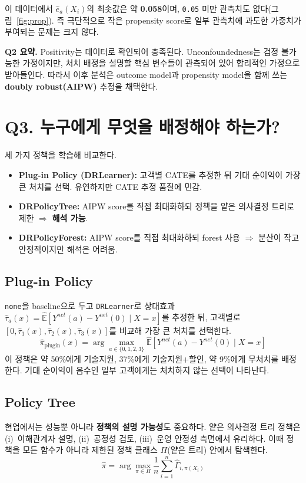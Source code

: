 \documentclass[11pt]{article}
\begin{document}
이 데이터에서 $\hat e_a(X_i)$의 최솟값은 약 \textbf{0.058}이며, \texttt{0.05} 미만 관측치도 없다(그림~\ref{fig:prop}). 즉 극단적으로 작은 propensity score로 일부 관측치에 과도한 가중치가 부여되는 문제는 크지 않다.

\textbf{Q2 요약.} Positivity는 데이터로 확인되어 충족된다. Unconfoundedness는 검정 불가능한 가정이지만, 처치 배정을 설명할 핵심 변수들이 관측되어 있어 합리적인 가정으로 받아들인다. 따라서 이후 분석은 outcome model과 propensity model을 함께 쓰는 \textbf{doubly robust(AIPW)} 추정을 채택한다.

\section{Q3. 누구에게 무엇을 배정해야 하는가?}

세 가지 정책을 학습해 비교한다.

\begin{itemize}[leftmargin=1.4em, itemsep=2pt]
  \item \textbf{Plug-in Policy (DRLearner):} 고객별 CATE를 추정한 뒤 기대 순이익이 가장 큰 처치를 선택. 유연하지만 CATE 추정 품질에 민감.
  \item \textbf{DRPolicyTree:} AIPW score를 직접 최대화하되 정책을 얕은 의사결정 트리로 제한 $\Rightarrow$ \textbf{해석 가능}.
  \item \textbf{DRPolicyForest:} AIPW score를 직접 최대화하되 forest 사용 $\Rightarrow$ 분산이 작고 안정적이지만 해석은 어려움.
\end{itemize}

\subsection{Plug-in Policy}
\texttt{none}을 baseline으로 두고 \texttt{DRLearner}로 상대효과 $\hat\tau_a(x) = \widehat{\mathbb{E}}[Y^{net}(a) - Y^{net}(0)\mid X=x]$를 추정한 뒤, 고객별로 $[0, \hat\tau_1(x), \hat\tau_2(x), \hat\tau_3(x)]$를 비교해 가장 큰 처치를 선택한다.
\[
\hat\pi_{\text{plugin}}(x) = \arg\max_{a \in \{0,1,2,3\}} \widehat{\mathbb{E}}[Y^{net}(a) - Y^{net}(0)\mid X=x]
\]
이 정책은 약 50\%에게 기술지원, 37\%에게 기술지원+할인, 약 9\%에게 무처치를 배정한다. 기대 순이익이 음수인 일부 고객에게는 처치하지 않는 선택이 나타난다.

\subsection{Policy Tree}
현업에서는 성능뿐 아니라 \textbf{정책의 설명 가능성}도 중요하다. 얕은 의사결정 트리 정책은 (i)~이해관계자 설명, (ii)~공정성 검토, (iii)~운영 안정성 측면에서 유리하다. 이때 정책을 모든 함수가 아니라 제한된 정책 클래스 $\Pi$(얕은 트리) 안에서 탐색한다.
\[
\hat\pi = \arg\max_{\pi \in \Pi} \frac{1}{n}\sum_{i=1}^{n} \widehat\Gamma_{i,\pi(X_i)}
\]
\end{document}
